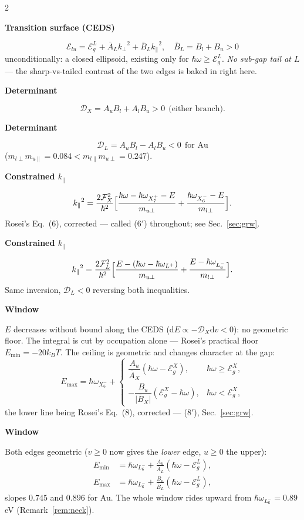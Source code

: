\documentclass[11pt,a4paper]{article}
\numberwithin{equation}{section}
\newcommand{\colstep}[1]{\par\vspace*{10pt}\noindent\textbf{#1}\par\nobreak\vspace*{3pt}\noindent\ignorespaces}
\begin{document}
\begin{paracol}{2}
\switchcolumn
\colstep{Transition surface (CEDS)}
\[{\mathcal{E}_{lu}}={\mathcal{E}_g^{L}}+{\bar{A}}_L{k_{\perp}}^2+{\bar{B}}_L{k_{\parallel}}^2,\quad {\bar{B}}_L=B_l+B_u>0\]
unconditionally: a closed ellipsoid, existing only for ${\hbar\omega}\ge{\mathcal{E}_g^{L}}$. \emph{No sub-gap tail at $L$} --- the sharp-vs-tailed contrast of the two edges is baked in right here.
\switchcolumn*
\colstep{Determinant}
\[{\mathcal{D}}_X=A_uB_l+A_lB_u>0\ \ \text{(either branch)} .\]
\switchcolumn
\colstep{Determinant}
\[{\mathcal{D}}_L=A_uB_l-A_lB_u<0\ \ \text{for Au}\]
($m_{l\perp}m_{u\parallel}=0.084<m_{l\parallel}m_{u\perp}=0.247$).
\switchcolumn*
\colstep{Constrained ${k_{\parallel}
}$}
\[{k_{\parallel}}^{2} =\frac{2{\mathcal{F}}_X^{2}}{\hbar^{2}}\Bigl[ \frac{{\hbar\omega}-{\hbar\omega_{X_7^+}}-E}{m_{u\perp}} +\frac{{\hbar\omega_{X_6^-}}-E}{m_{l\perp}}\Bigr].\]
Rosei's Eq.\ (6), corrected --- called ($6'$) throughout; see Sec.~\ref{sec:grw}.
\switchcolumn
\colstep{Constrained ${k_{\parallel}
}$}
\[{k_{\parallel}}^{2} =\frac{2{\mathcal{F}}_L^{2}}{\hbar^{2}}\Bigl[ \frac{E-({\hbar\omega}-{\hbar\omega_{L^+}})}{m_{u\perp}} +\frac{E-{\hbar\omega_{L_6^-}}}{m_{l\perp}}\Bigr].\]
Same inversion, ${\mathcal{D}}_L<0$ reversing both inequalities.
\switchcolumn*
\colstep{Window}
$E$ decreases without bound along the CEDS (${\mathrm{d}} E\propto-{\mathcal{D}}_X{\mathrm{d}} v<0$): no geometric floor.  The integral is cut by occupation alone --- Rosei's practical floor $E_{\min}=-20{k_B} T$.  The ceiling is geometric and changes character at the gap:
\[E_{\max}={\hbar\omega_{X_6^-}}+ \begin{cases} \dfrac{A_u}{{\bar{A}}_X}({\hbar\omega}-{\mathcal{E}_g^{X}}), & {\hbar\omega}\ge{\mathcal{E}_g^{X}},\\[10pt] -\dfrac{B_u}{\vert{}{\bar{B}}_X\vert{}}({\mathcal{E}_g^{X}}-{\hbar\omega}), & {\hbar\omega}<{\mathcal{E}_g^{X}}, \end{cases}\]
the lower line being Rosei's Eq.\ (8), corrected --- ($8'$), Sec.~\ref{sec:grw}.
\switchcolumn
\colstep{Window}
Both edges geometric ($v\ge0$ now gives the \emph{lower} edge, $u\ge0$ the upper):
\begin{align*}
E_{\min}&={\hbar\omega_{L_6^-}}+\frac{A_u}{{\bar{A}}_L}({\hbar\omega}-{\mathcal{E}_g^{L}}),\\ E_{\max}&={\hbar\omega_{L_6^-}}+\frac{B_u}{{\bar{B}}_L}({\hbar\omega}-{\mathcal{E}_g^{L}}),
\end{align*}
slopes $0.745$ and $0.896$ for Au.  The whole window rides upward from ${\hbar\omega_{L_6^-}}=0.89$ eV (Remark~\ref{rem:neck}).

\end{paracol}
\end{document}
